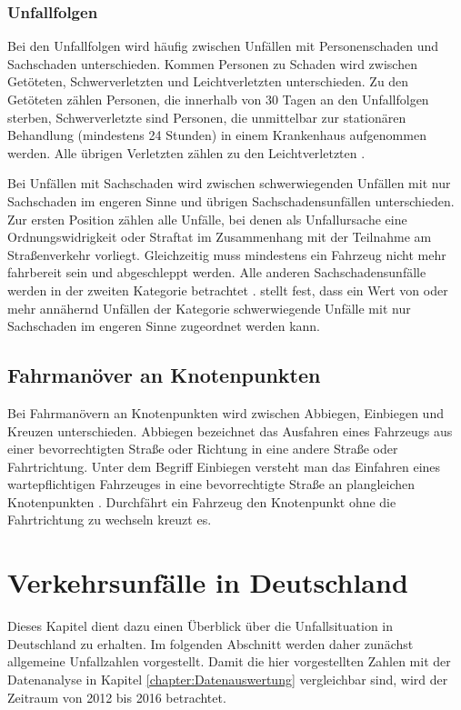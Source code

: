 \subsubsection{Unfallfolgen}\label{subsection:Unfallfolgen}
Bei den Unfallfolgen wird häufig zwischen Unfällen mit Personenschaden und Sachschaden unterschieden. Kommen Personen zu Schaden wird zwischen Getöteten, Schwerverletzten und Leichtverletzten unterschieden. Zu den Getöteten zählen Personen, die innerhalb von 30 Tagen an den Unfallfolgen sterben, Schwerverletzte sind Personen, die unmittelbar zur stationären Behandlung (mindestens 24 Stunden) in einem Krankenhaus aufgenommen werden. Alle übrigen Verletzten zählen zu den Leichtverletzten \parencite[S. 12]{StatistischesBundesamt.2018b}.

Bei Unfällen mit Sachschaden wird zwischen schwerwiegenden Unfällen mit nur Sachschaden im engeren Sinne und übrigen Sachschadensunfällen unterschieden. Zur ersten Position zählen alle Unfälle, bei denen als Unfallursache eine Ordnungswidrigkeit oder Straftat im Zusammenhang mit der Teilnahme am Straßenverkehr vorliegt. Gleichzeitig muss mindestens ein Fahrzeug nicht mehr fahrbereit sein und abgeschleppt werden. Alle anderen Sachschadensunfälle werden in der zweiten Kategorie betrachtet \parencite[S. 12]{StatistischesBundesamt.2018b}. \Textcite[S. 23]{Vollrath.2006} stellt fest, dass ein Wert von  oder mehr annähernd Unfällen der Kategorie schwerwiegende Unfälle mit nur Sachschaden im engeren Sinne zugeordnet werden kann.

\subsection{Fahrmanöver an Knotenpunkten}
Bei Fahrmanövern an Knotenpunkten wird zwischen Abbiegen, Einbiegen und Kreuzen unterschieden. Abbiegen bezeichnet das Ausfahren eines Fahrzeugs aus einer bevorrechtigten Straße oder Richtung in eine andere Straße oder Fahrtrichtung. Unter dem Begriff Einbiegen versteht man das Einfahren eines wartepflichtigen Fahrzeuges in eine bevorrechtigte Straße an plangleichen Knotenpunkten \parencite[S. 90f]{ForschungsgesellschaftfurStraenundVerkehrswesen.2012b}. Durchfährt ein Fahrzeug den Knotenpunkt ohne die Fahrtrichtung zu wechseln kreuzt es.

\section{Verkehrsunfälle in Deutschland}\label{chapter:Verkehrsunfälle in Deutschland}
Dieses Kapitel dient dazu einen Überblick über die Unfallsituation in Deutschland zu erhalten. Im folgenden Abschnitt werden daher zunächst allgemeine Unfallzahlen vorgestellt. Damit die hier vorgestellten Zahlen mit der Datenanalyse in Kapitel \ref{chapter:Datenauswertung} vergleichbar sind, wird der Zeitraum von 2012 bis 2016 betrachtet.

